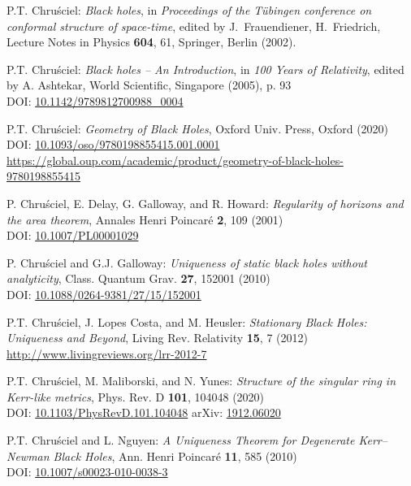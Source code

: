 \begin{thebibliography}{123}
P.T. Chru\'sciel: {\em Black holes},
in {\em Proceedings of the T\"ubingen conference on conformal structure of
space-time}, edited by J.~Frauendiener, H.~Friedrich,
Lecture Notes in Physics {\bf 604}, 61,
Springer, Berlin (2002).

P.T. Chru\'sciel: {\em Black holes -- An Introduction},
in {\em 100 Years of Relativity}, edited by A. Ashtekar,
World Scientific, Singapore (2005), p. 93\\
DOI: \href{https://doi.org/10.1142/9789812700988_0004}{10.1142/9789812700988\_0004}

P.T. Chru\'sciel: {\em Geometry of Black Holes},
Oxford Univ. Press, Oxford (2020)\\
DOI: \href{https://doi.org/10.1093/oso/9780198855415.001.0001}{10.1093/oso/9780198855415.001.0001}\\
{\footnotesize \url{https://global.oup.com/academic/product/geometry-of-black-holes-9780198855415}}

P. Chru\'sciel, E. Delay, G. Galloway, and R. Howard:
{\em Regularity of horizons and the area theorem},
Annales Henri Poincar\'e {\bf 2}, 109 (2001)\\
DOI: \href{https://doi.org/10.1007/PL00001029}{10.1007/PL00001029}

P. Chru\'sciel and G.J. Galloway:
{\em Uniqueness of static black holes without analyticity},
Class. Quantum Grav. {\bf 27}, 152001 (2010)\\
DOI: \href{https://doi.org/10.1088/0264-9381/27/15/152001}{10.1088/0264-9381/27/15/152001}

P.T. Chru\'sciel, J. Lopes Costa, and M. Heusler:
{\em Stationary Black Holes: Uniqueness and Beyond},
Living Rev. Relativity {\bf 15}, 7 (2012) \\
\url{http://www.livingreviews.org/lrr-2012-7}

P.T. Chru\'sciel, M. Maliborski, and N. Yunes:
{\em Structure of the singular ring in Kerr-like metrics},
Phys. Rev. D {\bf 101}, 104048 (2020)\\
DOI: \href{https://doi.org/10.1103/PhysRevD.101.104048}{10.1103/PhysRevD.101.104048}\hfill
arXiv: \href{https://arxiv.org/abs/1912.06020}{1912.06020}

P.T. Chru\'sciel and L. Nguyen:
{\em A Uniqueness Theorem for Degenerate Kerr–Newman Black Holes},
Ann. Henri Poincar\'e {\bf 11}, 585 (2010)\\
DOI: \href{https://doi.org/10.1007/s00023-010-0038-3}{10.1007/s00023-010-0038-3}


\end{thebibliography}

